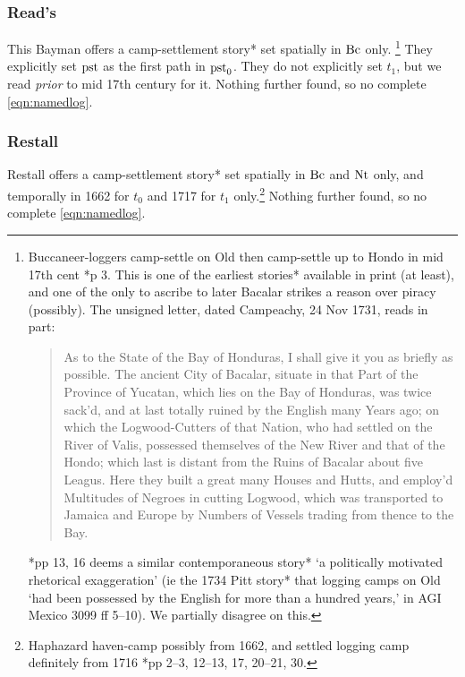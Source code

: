 		\subsubsection{Read's}
		\label{sss:reads}
		This Bayman offers a camp-settlement story* set spatially in \(\operatorname{Bc}\) only.%
		\footnote{Buccaneer-loggers camp-settle on Old then camp-settle up to Hondo in mid 17th cent \cite{rds32}*{p 3}. This is one of the earliest stories* available in print (at least), and one of the only to ascribe to later Bacalar strikes a reason over piracy (possibly). The unsigned letter, dated Campeachy, 24 Nov 1731, reads in part:\begin{quote}As to the State of the Bay of Honduras, I shall give it you as briefly as possible. The ancient City of Bacalar, situate in that Part of the Province of Yucatan, which lies on the Bay of Honduras, was twice sack'd, and at last totally ruined by the English many Years ago; on which the Logwood-Cutters of that Nation, who had settled on the River of Valis, possessed themselves of the New River and that of the Hondo; which last is distant from the Ruins of Bacalar about five Leagus. Here they built a great many Houses and Hutts, and employ'd Multitudes of Negroes in cutting Logwood, which was transported to Jamaica and Europe by Numbers of Vessels trading from thence to the Bay.\end{quote} \cite{res19}*{pp 13, 16} deems a similar contemporaneous story* `a politically motivated rhetorical exaggeration' (ie the 1734 Pitt story* that logging camps on Old `had been possessed by the English for more than a hundred years,' in AGI Mexico 3099 ff 5--10). We partially disagree on this.} %
		They explicitly set \(\operatorname{pst}\) as the first path in \(\operatorname{pst}_0\). They do not explicitly set \(t_1\), but we read \emph{prior} to mid 17th century for it. Nothing further found, so no complete \ref{eqn:namedlog}.
		\subsubsection{Restall}
		\label{sss:restall}
		Restall offers a camp-settlement story* set spatially in \(\operatorname{Bc}\) and \(\operatorname{Nt}\) only, and temporally in 1662 for \(t_0\) and 1717 for \(t_1\) only.\footnote{Haphazard haven-camp possibly from 1662, and settled logging camp definitely from 1716 \cite{res19}*{pp 2--3, 12--13, 17, 20--21, 30}.} Nothing further found, so no complete \ref{eqn:namedlog}.

